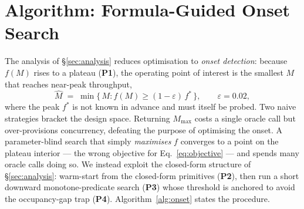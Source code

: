 \section{Algorithm: Formula-Guided Onset Search}
\label{sec:algorithm}

The analysis of \S\ref{sec:analysis} reduces optimisation to \emph{onset detection}:
because $f(M)$ rises to a plateau (\textbf{P1}), the operating point of interest is the
smallest $M$ that reaches near-peak throughput,
\begin{equation}
  \hat M \;=\; \min\{\, M : f(M) \ge (1-\varepsilon)\,f^\ast \,\},
  \qquad \varepsilon = 0.02,
  \label{eq:objective}
\end{equation}
where the peak $f^\ast$ is not known in advance and must itself be probed. Two naive
strategies bracket the design space. Returning $M_{\max}$ costs a single oracle call but
over-provisions concurrency, defeating the purpose of optimising the onset. A
parameter-blind search that simply \emph{maximises} $f$ converges to a point on the
plateau interior --- the wrong objective for Eq.~\eqref{eq:objective} --- and spends many
oracle calls doing so. We instead exploit the closed-form structure of
\S\ref{sec:analysis}: warm-start from the closed-form primitives (\textbf{P2}), then run a
short downward monotone-predicate search (\textbf{P3}) whose threshold is anchored to avoid
the occupancy-gap trap (\textbf{P4}). Algorithm~\ref{alg:onset} states the procedure.

